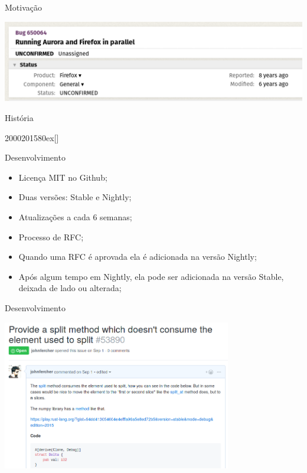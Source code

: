\documentclass[aspectratio=169]{beamer}
\begin{document}
\begin{frame}{Motivação}
	\begin{center}
		\includegraphics[width=13.5cm]{imgs/bug.png}
	\end{center}
\end{frame}

\begin{frame}{História}
	\begin{chronology}[5]{2000}{2015}{80ex}[\textwidth]
	\end{chronology}
\end{frame}

\begin{frame}{Desenvolvimento}
	\begin{itemize}
		\item Licença MIT no Github;
		\item Duas versões: Stable e Nightly;
		\item Atualizações a cada 6 semanas;
		\item Processo de RFC;
		\item Quando uma RFC é aprovada ela é adicionada na versão Nightly;
		\item Após algum tempo em Nightly, ela pode ser adicionada na versão Stable, deixada de lado ou alterada;	
	\end{itemize}
\end{frame}

\begin{frame}{Desenvolvimento}
	\begin{center}
		\includegraphics[width=10.0cm]{imgs/rfc.png}
	\end{center}
\end{frame}
\end{document}
